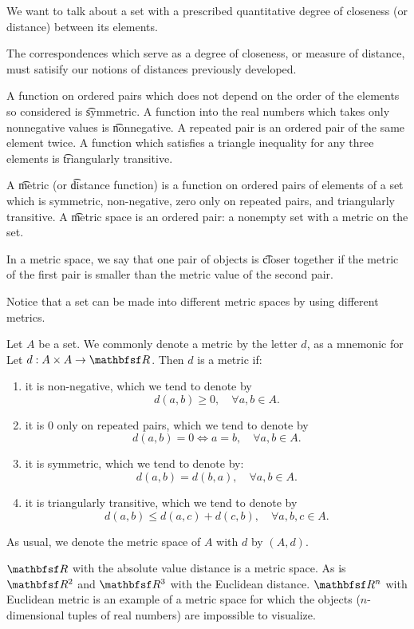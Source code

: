 

We want to talk about a set
with a prescribed quantitative
degree of closeness (or distance)
between its elements.


The correspondences
which serve as a
degree of closeness,
or measure of distance, must
satisify our notions of distances
previously developed.

A function on ordered pairs which does not depend on the order of the elements so considered is \t{symmetric}.
A function into the real numbers which takes only nonnegative values is \t{nonnegative}.
A repeated pair is an ordered pair of the same element twice.
A function which satisfies a triangle inequality for any three elements is \t{triangularly transitive}.

A \t{metric} (or \t{distance function}) is a function on ordered pairs of elements of a set which is symmetric, non-negative, zero only on repeated pairs, and triangularly transitive.
A \t{metric space} is an ordered pair: a nonempty set with a metric on the set.

In a metric space, we say that one pair of objects is \t{closer} together if the metric of the first pair is smaller than the metric value of the second pair.

Notice that a set can be made into different metric spaces by using different metrics.


Let $A$ be a set.
We commonly denote a metric by the letter $d$, as a mnemonic for 
Let $d: A \times A \to \R$.
Then $d$ is a metric if:
\begin{enumerate}
  \item
    it is non-negative,
    which we tend to denote by
    $$
      d(a, b) \geq 0, \quad \forall a,b \in A.
    $$
  \item
    it is $0$ only on repeated pairs, which we tend to denote
    by
    $$
      d(a, b) = 0 \iff a = b, \quad \forall a,b \in A.
    $$

  \item
    it is symmetric, which we tend to denote by:
    $$
      d(a, b) = d(b, a), \quad \forall a,b \in A.
    $$
  \item
    it is triangularly transitive, which we tend to
    denote by
    $$
      d(a, b) \leq d(a, c) + d(c, b), \quad \forall a,b,c \in A.
    $$
\end{enumerate}
As usual, we denote the metric space
of $A$ with $d$ by
$(A, d)$.


$\R$ with the absolute value distance is a metric space. As is $\R^2$ and $\R^3$ with the Euclidean distance. $\R^n$ with Euclidean metric is an example of a metric space for which the objects ($n$-dimensional tuples of real numbers) are impossible to visualize.

